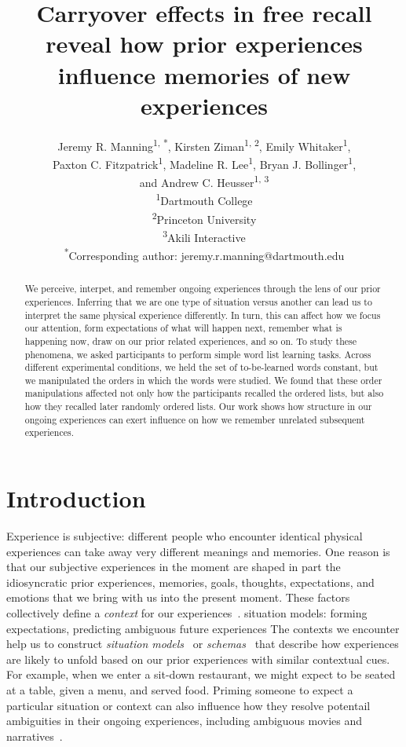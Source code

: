 \documentclass[11pt]{article}
\title{Carryover effects in free recall reveal how prior experiences influence
memories of new experiences}
\author{Jeremy R. Manning\textsuperscript{1, *}, Kirsten
Ziman\textsuperscript{1, 2}, Emily Whitaker\textsuperscript{1},\\Paxton C.
Fitzpatrick\textsuperscript{1}, Madeline R. Lee\textsuperscript{1}, Bryan J.
Bollinger\textsuperscript{1},\\and Andrew C. Heusser\textsuperscript{1,
3}\\\textsuperscript{1}Dartmouth College\\\textsuperscript{2}Princeton
University\\\textsuperscript{3}Akili
Interactive\\\textsuperscript{*}Corresponding author:
jeremy.r.manning@dartmouth.edu}
\date{}
\begin{document}
\maketitle

\begin{abstract} We perceive, interpet, and remember ongoing experiences
through the lens of our prior experiences. Inferring that we are one type of
situation versus another can lead us to interpret the same physical experience
differently. In turn, this can affect how we focus our attention, form
expectations of what will happen next, remember what is happening now, draw on
our prior related experiences, and so on. To study these phenomena, we asked
participants to perform simple word list learning tasks. Across different
experimental conditions, we held the set of to-be-learned words constant, but
we manipulated the orders in which the words were studied. We found that these
order manipulations affected not only how the participants recalled the ordered
lists, but also how they recalled later randomly ordered lists. Our work shows
how structure in our ongoing experiences can exert influence on how we remember
unrelated subsequent experiences. \end{abstract}


\section*{Introduction}


Experience is subjective: different people who encounter identical physical
experiences can take away very different meanings and memories. One reason is
that our subjective experiences in the moment are shaped in part the
idiosyncratic prior experiences, memories, goals, thoughts, expectations, and
emotions that we bring with us into the present moment. These factors
collectively define a \textit{context} for our experiences~\citep{Mann20}. %
situation models: forming expectations, predicting ambiguous future experiences
The contexts we encounter help us to construct \textit{situation
models}~\citep{RangRitc12, MannEtal15} or \textit{schemas}~\citep{MasiEtal22,
BaldEtal18} that describe how experiences are likely to unfold based on our
prior experiences with similar contextual cues. For example, when we enter a
sit-down restaurant, we might expect to be seated at a table, given a menu, and
served food. Priming someone to expect a particular situation or context can
also influence how they resolve potentail ambiguities in their ongoing
experiences, including ambiguous movies and narratives~\citep{YeshEtal17}.
\end{document}
